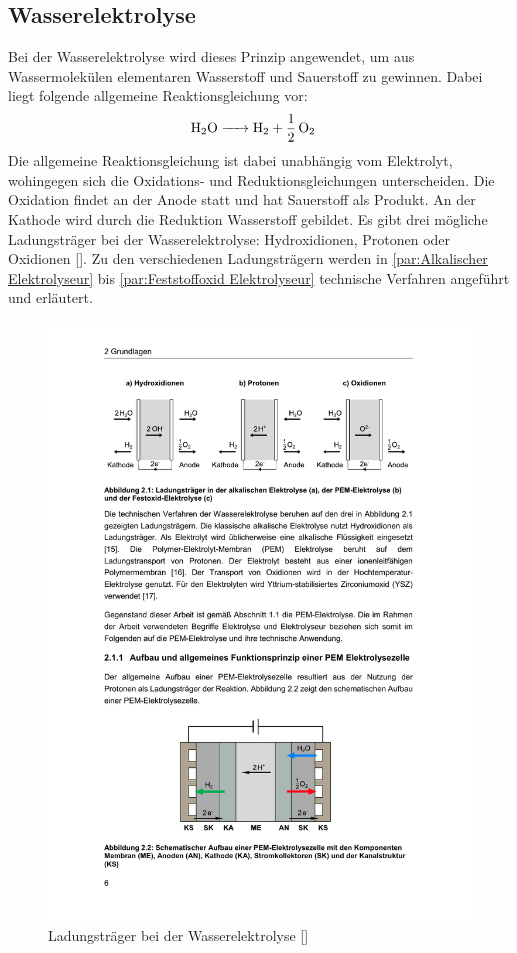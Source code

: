 \subsection{Wasserelektrolyse}
\label{subsec:Elektrolyse} 
Bei der Wasserelektrolyse wird dieses Prinzip angewendet, um aus Wassermolekülen elementaren Wasserstoff und Sauerstoff zu gewinnen. Dabei liegt folgende allgemeine Reaktionsgleichung vor:   
\begin{align}
	\label{gl:Reaktionsgleichung}
	\ce{ H2O &-> H2 + 1/2O2}
\end{align}
Die allgemeine Reaktionsgleichung ist dabei unabhängig vom Elektrolyt, wohingegen sich die Oxidations- und Reduktionsgleichungen unterscheiden. Die Oxidation findet an der Anode statt und hat Sauerstoff als Produkt. An der Kathode wird durch die Reduktion Wasserstoff gebildet. Es gibt drei mögliche Ladungsträger bei der Wasserelektrolyse: Hydroxidionen, Protonen oder Oxidionen [\cite{ISBN 978-3-95806-217-7}]. Zu den verschiedenen Ladungsträgern werden in  \ref{par:Alkalischer Elektrolyseur} bis \ref{par:Feststoffoxid Elektrolyseur} technische Verfahren angeführt und erläutert.
\begin{figure}[h]
	\centering
		\includegraphics[scale=1]{Figures/LadungstraegerBeiDerWasserelektrolyse}
		\caption{Ladungsträger bei der 
		Wasserelektrolyse [\cite{ISBN 978-3-95806-217-7}]}
\label{fig:LadungstraegerBeiDerWasserelektrolyse}	
\end{figure}

